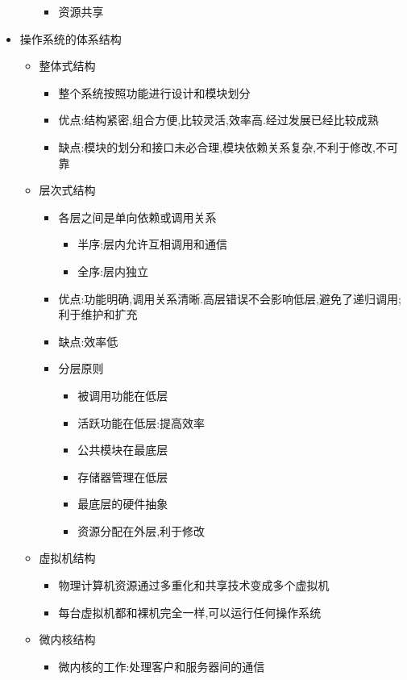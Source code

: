 \documentclass[a4paper,10pt,notitlepage]{article}
\begin{document}
\begin{itemize}
\begin{itemize}
\begin{itemize}
			\item 资源共享
		\end{itemize}
	\end{itemize}
	\item 操作系统的体系结构
	\begin{itemize}
		\item 整体式结构
		\begin{itemize}
			\item 整个系统按照功能进行设计和模块划分
			\item 优点:结构紧密,组合方便,比较灵活,效率高.经过发展已经比较成熟
			\item 缺点:模块的划分和接口未必合理,模块依赖关系复杂,不利于修改,不可靠
		\end{itemize}
		\item 层次式结构
		\begin{itemize}
			\item 各层之间是单向依赖或调用关系
			\begin{itemize}
				\item 半序:层内允许互相调用和通信
				\item 全序:层内独立
			\end{itemize}
			\item 优点:功能明确,调用关系清晰.高层错误不会影响低层,避免了递归调用;利于维护和扩充
			\item 缺点:效率低
			\item 分层原则
			\begin{itemize}
				\item 被调用功能在低层
				\item 活跃功能在低层:提高效率
				\item 公共模块在最底层
				\item 存储器管理在低层
				\item 最底层的硬件抽象
				\item 资源分配在外层,利于修改
			\end{itemize}
		\end{itemize}
		\item 虚拟机结构
		\begin{itemize}
			\item 物理计算机资源通过多重化和共享技术变成多个虚拟机
			\item 每台虚拟机都和裸机完全一样,可以运行任何操作系统
		\end{itemize}
		\item 微内核结构
		\begin{itemize}
			\item 微内核的工作:处理客户和服务器间的通信

\end{itemize}
\end{itemize}
\end{itemize}
\end{document}
